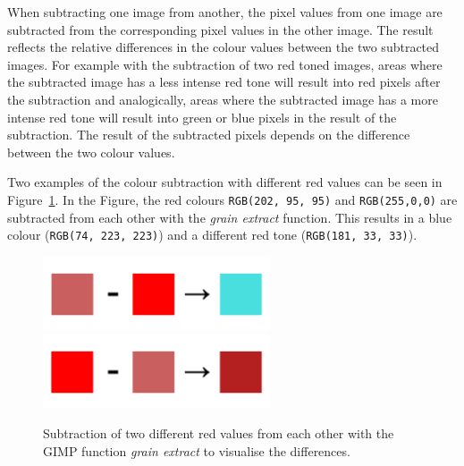 \documentclass[../MasterThesis.tex]{subfiles}
\begin{document}
When subtracting one image from another, the pixel values from one image are subtracted from the corresponding pixel values in the other image. 
The result reflects the relative differences in the colour values between the two subtracted images. For example with the subtraction of two red toned images, areas where the subtracted image has a less intense red tone will result into red pixels after the subtraction and analogically, areas where the subtracted image has a more intense red tone will result into green or blue pixels in the result of the subtraction. The result of the subtracted pixels depends on the difference between the two colour values.

Two examples of the colour subtraction with different red values can be seen in Figure~\ref{figure:neonminuslight}. In the Figure, the red colours \texttt{RGB(202, 95, 95)} and \texttt{RGB(255,0,0)} are subtracted from each other with the \textit{grain extract} function. This results in a blue colour (\texttt{RGB(74, 223, 223)}) and a different red tone (\texttt{RGB(181, 33, 33)}). 






\begin{figure}[H]
	
	\centering
	
	\includegraphics[width=0.6\textwidth]{lightMINUSneon.png}
	\includegraphics[width=0.6\textwidth]{neonMINUSlight.png}
	
	\caption[Colour subtraction with the GIMP function \textit{grain extract}.]{Subtraction of two different red values from each other with the GIMP function \textit{grain extract} to visualise the differences.}
	\label{figure:neonminuslight}
	
\end{figure}
\end{document}
